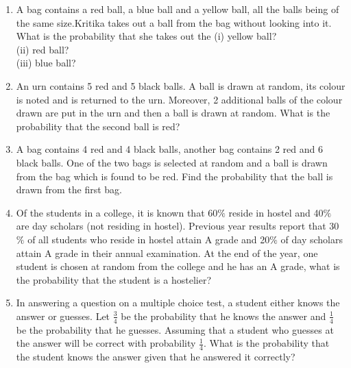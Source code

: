 \begin{enumerate}[label=\thesection.\arabic*.,ref=\thesection.\theenumi]
\item A bag contains a red ball, a blue ball and a yellow ball, all the balls being
of the same size.Kritika takes out a ball from the bag without looking into it. What is the probability that she takes out the
(i) yellow ball? \\
(ii) red ball?\\
(iii) blue ball?
\\
\solution

\item An urn contains 5 red and 5 black balls. A ball is drawn at random, its colour is noted and is returned to the urn. Moreover, 2 additional balls of the colour drawn are put in the urn and then a ball is drawn at random. What is the probability that the second ball is red?\\
\solution


\item A bag contains 4 red and 4 black balls, another bag contains 2 red and 6 black balls. One of the two bags is selected at random and a ball is drawn from the bag which is found to be red. Find the probability that the ball is drawn from the first bag.\\
\solution


\item Of the students in a college, it is known that 60$\%$ reside in hostel and 40$\%$ are day scholars (not residing in hostel). Previous year results report that 30$\%$ of all students who reside in hostel attain A grade and 20$\%$ of day scholars attain A grade in their annual examination. At the end of the year, one student is chosen at random from the college and he has an A grade, what is the probability that the student is a hostelier?\\
\solution


\item In answering a question on a multiple choice test, a student either knows the
answer or guesses. Let $\frac{3}{4}$ be the probability that he knows the answer and $\frac{1}{4}$ be the probability that he guesses. Assuming that a student who guesses at the answer will be correct with probability $\frac{1}{4}$. What is the probability that the student knows the answer given that he answered it correctly?\\
\solution


\end{enumerate}
